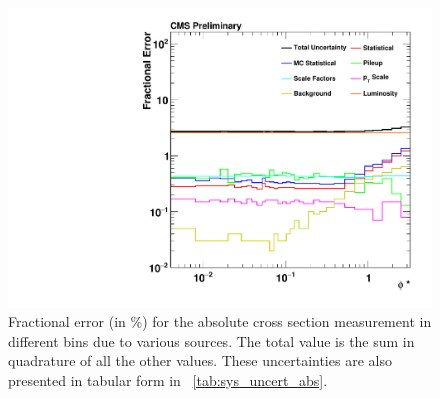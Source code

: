 \begin{figure}[!p]
    \centering
    \includegraphics[width=\textwidth]{figures/data_uncertainty_absolute.pdf}
    \caption[
        Fractional errors (in \%) for the absolute cross section measurement.
    ]{
        Fractional error (in \%) for the absolute cross section measurement in
        different \phistar bins due to various sources. The total value is the
        sum in quadrature of all the other values. These uncertainties are also
        presented in tabular form in \TAB~\ref{tab:sys_uncert_abs}.
    }
    \label{fig:sys_uncert_abs}
\end{figure}
